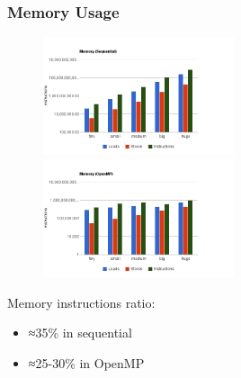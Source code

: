 \documentclass{beamer}
\begin{document}
\begin{frame}
	\frametitle{Memory Usage}

\begin{figure}
\begin{center}
\includegraphics[width=0.5\textwidth]{images/pfac/chrtmemseq.png}
\includegraphics[width=0.5\textwidth]{images/pfac/chrtmemomp.png}
\end{center}
\end{figure}

Memory instructions ratio:
\begin{itemize}
\item{≈35\% in sequential}
\item{≈25-30\% in OpenMP}
\end{itemize}

\end{frame}
\end{document}
